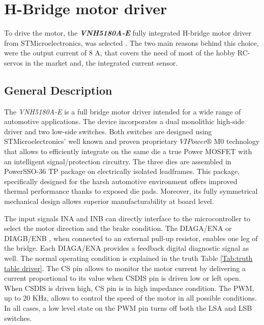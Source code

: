 
\newpage

\section{H-Bridge motor driver} \label{sec:Driver}

To drive the motor, the \textit{\textbf{VNH5180A-E}} fully integrated H-bridge motor driver from STMicroelectronics, was selected \cite{Driver}. The two main reasons behind this choice, were the output current of 8 A, that covers the need of most of the hobby RC-servos in the market and, the integrated current sensor.

\subsection{General Description}

The \textit{VNH5180A-E} is a full bridge motor driver intended for a wide range of automotive applications. The device incorporates a dual monolithic high-side driver and two low-side switches. Both switches are designed using STMicroelectronics’ well known and proven proprietary $VIPower®$ M0 technology that allows to efficiently integrate on the same die a true Power MOSFET with an intelligent signal/protection circuitry. The three dies are assembled in PowerSSO-36 TP package on electrically isolated leadframes. This package, specifically designed for the harsh automotive environment offers improved thermal performance thanks to exposed die pads. Moreover, its fully symmetrical mechanical design allows superior manufacturability at board level. 

The input signals IN\textunderscore A and IN\textunderscore B can directly interface to the microcontroller to select the motor direction and the brake condition. The DIAG\textunderscore A/EN\textunderscore A or DIAG\textunderscore B/EN\textunderscore B , when connected to an external pull-up resistor, enables one leg of the bridge. Each DIAG\textunderscore A/EN\textunderscore A provides a feedback digital diagnostic signal as well. The normal operating condition is explained in the truth Table \ref{Tab:truth table driver}. The CS pin allows to monitor the motor current by delivering a current proportional to its value when CS\textunderscore DIS pin is driven low or left open. When CS\textunderscore DIS is driven high, CS pin is in high impedance condition. The PWM, up to 20 KHz, allows to control the speed of the motor in all possible conditions. In all cases, a low level state on the PWM pin turns off both the LS\textunderscore A and LS\textunderscore B switches.


